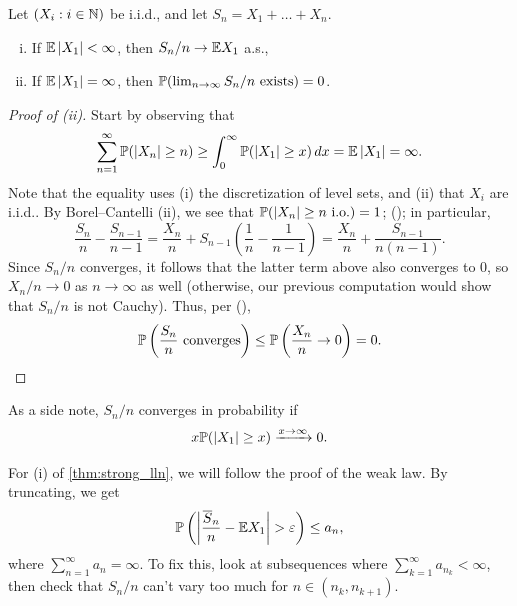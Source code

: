 \begin{theorem} \label{thm:strong_lln}
    Let $(X_i : i \in \mathbb N)$ be i.i.d., and let $S_n = X_1 + \dots + X_n$.
    \begin{enumerate}[(i)]
        \item If $\mathbb E \left\lvert X_1 \right\rvert < \infty$, then $S_n/n \to \mathbb E X_1$ a.s.,
        \item If $\mathbb E \left\lvert X_1 \right\rvert = \infty$, then $\mathbb P(\lim_{n \to \infty} S_n/n \text{ exists}) = 0$.
    \end{enumerate}
\end{theorem}
\begin{proof}[Proof of (ii)]
    Start by observing that
    \[ \sum_{n=1}^\infty \mathbb P(\left\lvert X_n \right\rvert \geq n) \geq \int_0^\infty \mathbb P(\left\lvert X_1 \right\rvert \geq x) \, dx = \mathbb E \left\lvert X_1 \right\rvert = \infty. \]
    Note that the equality uses (i) the discretization of level sets, and (ii) that $X_i$ are i.i.d.. By Borel--Cantelli (ii), we see that $\mathbb P(\left\lvert X_n \right\rvert \geq n \text{ i.o.}) = 1$; (\textdagger); in particular,
    \[ \frac{S_n}{n} - \frac{S_{n-1}}{n-1} = \frac{X_n}{n} + S_{n-1} \left(\frac{1}{n} - \frac{1}{n-1}\right) = \frac{X_n}{n} + \frac{S_{n-1}}{n(n-1)}. \]
    Since $S_n/n$ converges, it follows that the latter term above also converges to $0$, so $X_n/n \to 0$ as $n \to \infty$ as well (otherwise, our previous computation would show that $S_n/n$ is not Cauchy). Thus, per (\textdagger),
    \[ \mathbb P\left(\frac{S_n}{n} \text{ converges}\right) \leq \mathbb P\left(\frac{X_n}{n} \to 0\right) = 0. \qedhere \]
\end{proof}
As a side note, $S_n/n$ converges in probability if
\[ x \mathbb P(\left\lvert X_1 \right\rvert \geq x) \xrightarrow{x \to \infty} 0. \]

\newpage
For (i) of \ref{thm:strong_lln}, we will follow the proof of the weak law. By truncating, we get
\[ \mathbb P\left(\left\lvert \frac{\overline S_n}{n} - \mathbb E X_1 \right\rvert > \varepsilon\right) \leq a_n, \]
where $\sum_{n=1}^\infty a_n = \infty$. To fix this, look at subsequences where $\sum_{k=1}^\infty a_{n_k} < \infty$, then check that $S_n/n$ can't vary too much for $n \in (n_k, n_{k+1})$.

